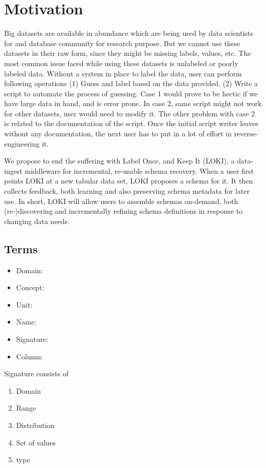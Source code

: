 \documentclass{vldb}
\begin{document}
\section{Motivation}
Big datasets are available in abundance which are being used by data scientists for and database community for research purpose. But we cannot use these datasets in their raw form, since they might be missing labels, values, etc. The most common issue faced while using these datasets is unlabeled or poorly labeled data. Without a system in place to label the data, user can perform following operations (1) Guess and label based on the data provided. (2) Write a script to automate the process of guessing. Case 1 would prove to be hectic if we have large data in hand, and is error prone. In case 2, same script might not work for other datasets, user would need to modify it. The other problem with case 2 is related to the documentation of the script. Once the initial script writer leaves without any documentation, the next user has to put in a lot of effort in reverse-engineering it.

We propose to end the suffering with Label Once, and Keep It (LOKI),
a data-ingest middleware for incremental, re-usable schema recovery.
When a user first points LOKI at a new tabular data set, LOKI proposes a schema for it. It then collects feedback, both learning and also preserving schema metadata for later use. In short, LOKI will allow users to assemble schemas on-demand, both (re-)discovering and incrementally refining schema definitions in response to changing data needs. 

\subsection{Terms}
\begin{itemize}
	\item Domain: 
	\item Concept:
	\item Unit:
	\item Name:
	\item Signature:
	\item Column:
\end{itemize}

Signature consists of 
\begin{enumerate}
	\item Domain
	\item Range
	\item Distribution
	\item Set of values
	\item type
\end{enumerate}
\end{document}
